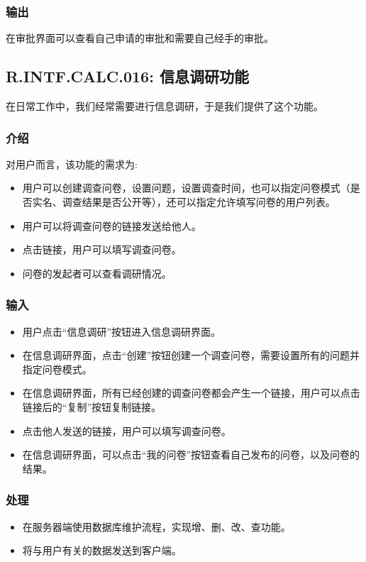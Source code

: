 {\subsubsection{输出}
在审批界面可以查看自己申请的审批和需要自己经手的审批。

\subsection{\color{red}R.INTF.CALC.016: 信息调研功能}
在日常工作中，我们经常需要进行信息调研，于是我们提供了这个功能。
\subsubsection{介绍}
对用户而言，该功能的需求为:
\begin{itemize}
  \item 用户可以创建调查问卷，设置问题，设置调查时间，也可以指定问卷模式（是否实名、调查结果是否公开等），还可以指定允许填写问卷的用户列表。
  \item 用户可以将调查问卷的链接发送给他人。
  \item 点击链接，用户可以填写调查问卷。
  \item 问卷的发起者可以查看调研情况。
\end{itemize}
\subsubsection{输入}
\begin{itemize}
  \item 用户点击“信息调研”按钮进入信息调研界面。
  \item 在信息调研界面，点击“创建”按钮创建一个调查问卷，需要设置所有的问题并指定问卷模式。
  \item 在信息调研界面，所有已经创建的调查问卷都会产生一个链接，用户可以点击链接后的“复制”按钮复制链接。
  \item 点击他人发送的链接，用户可以填写调查问卷。
  \item 在信息调研界面，可以点击“我的问卷”按钮查看自己发布的问卷，以及问卷的结果。
\end{itemize}
\subsubsection{处理}
\begin{itemize}
  \item 在服务器端使用数据库维护流程，实现增、删、改、查功能。
  \item 将与用户有关的数据发送到客户端。
\end{itemize}
}
